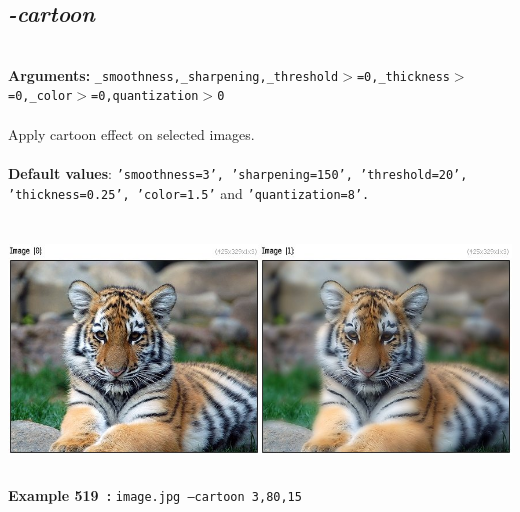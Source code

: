 \documentclass[a4paper,11pt,twoside]{book}
\begin{document}
\subsection{\emph{-cartoon} }\vspace*{-0.5em}
~\\\textbf{Arguments: } 
{\small \texttt{\_smoothness,\_sharpening,\_threshold$>$=0,\_thickness$>$=0,\_color$>$=0,quantization$>$0}}\\~\\
Apply cartoon effect on selected images.
~\\~\\\textbf{Default values}: {\small \texttt{'smoothness=3', 'sharpening=150', 'threshold=20', 'thickness=0.25', 'color=1.5'} and \texttt{'quantization=8'.}}
\begin{center}\includegraphics[keepaspectratio=true,height=7cm,width=\textwidth]{img/gmic_def519.jpg}\\
{\footnotesize \textbf{Example 519~:} \texttt{image.jpg --cartoon 3,80,15}}
\end{center}
\end{document}
